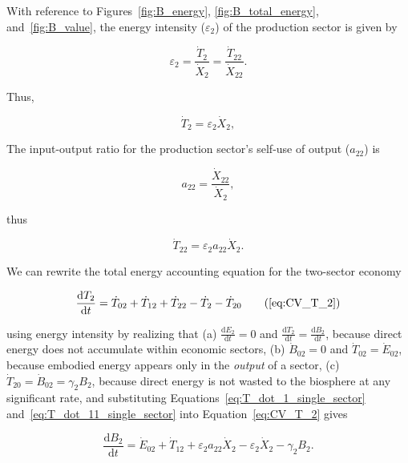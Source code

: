 With reference to Figures~\ref{fig:B_energy}, 
\ref{fig:B_total_energy},
and~\ref{fig:B_value}, 
the energy intensity ($\varepsilon_{2}$) 
of the production sector is given by

\begin{equation} \label{eq:single_sector_energy_intensity}
	\varepsilon_{2} 
	= \frac{\dot{T}_{2}}{\dot{X}_{2}} 
	= \frac{\dot{T}_{22}}{\dot{X}_{22}}.
\end{equation}

\noindent{}Thus,

\begin{equation} \label{eq:T_dot_1_single_sector}
	\dot{T}_{2} = \varepsilon_{2}\dot{X}_{2},
\end{equation}

The input-output ratio 
for the production sector's self-use of output ($a_{22}$) is

\begin{equation} \label{eq:io_ratio_single_sector}
	a_{22} = \frac{\dot{X}_{22}}{\dot{X}_{2}},
\end{equation}

\noindent{}thus

\begin{equation} \label{eq:T_dot_11_single_sector}
	\dot{T}_{22} = \varepsilon_{2}a_{22}\dot{X}_{2}.
\end{equation}

We can rewrite the total energy accounting equation 
for the two-sector economy

\begin{equation}
	\frac{\mathrm{d}T_{2}}{\mathrm{d}t} 	 
	= \dot{T}_{02} 
	+ \dot{T}_{12}
	+ \dot{T}_{22} 
	- \dot{T}_{2} 
	- \dot{T}_{20} \tag{\ref{eq:CV_T_2}}
\end{equation}

\noindent{}using energy intensity by realizing that 
(a) $\frac{\mathrm{d}E_2}{\mathrm{d}t} = 0$
and
$\frac{\mathrm{d}T_2}{\mathrm{d}t} = \frac{\mathrm{d}B_2}{\mathrm{d}t}$, 
because direct energy
does not accumulate within economic sectors,
(b) $\dot{B}_{02} = 0$ and $\dot{T}_{02} = \dot{E}_{02}$,
because embodied energy appears only in the \emph{output} of a sector, 
(c) $\dot{T}_{20} = \dot{B}_{02} = \gamma_{2}B_{2}$, 
because direct energy is not wasted to the biosphere at any significant rate, and
substituting Equations~\ref{eq:T_dot_1_single_sector} 
and~\ref{eq:T_dot_11_single_sector} into Equation~\ref{eq:CV_T_2} gives

\begin{equation} \label{eq:dB1/dt_single_sector_after_substituting_eps_and_a}
	\frac{\mathrm{d}B_{2}}{\mathrm{d}t} 
	= \dot{E}_{02} 
	+ \dot{T}_{12}
	+ \varepsilon_{2}a_{22}\dot{X}_{2} 
	- \varepsilon_{2}\dot{X}_{2} 
	- \gamma_{2}B_{2}.
\end{equation}

